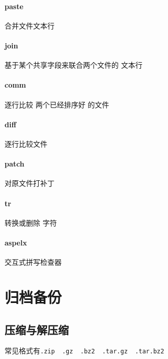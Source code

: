 \documentclass[UTF8,a4paper,12pt]{ctexbook}
\begin{document}
		\paragraph{paste} 合并文件文本行
		
		\paragraph{join} 基于某个共享字段来联合两个文件的 文本行
		
		\paragraph{comm} 逐行比较 两个已经排序好 的文件
		
		\paragraph{diff} 逐行比较文件
		
		\paragraph{patch} 对原文件打补丁
		
		\paragraph{tr} 转换或删除 字符
		
		\paragraph{aspelx} 交互式拼写检查器
		
		
	\section{归档备份}
		\subsection{压缩与解压缩}常见格式有\verb|.zip  .gz  .bz2  .tar.gz  .tar.bz2|
			
\end{document}

